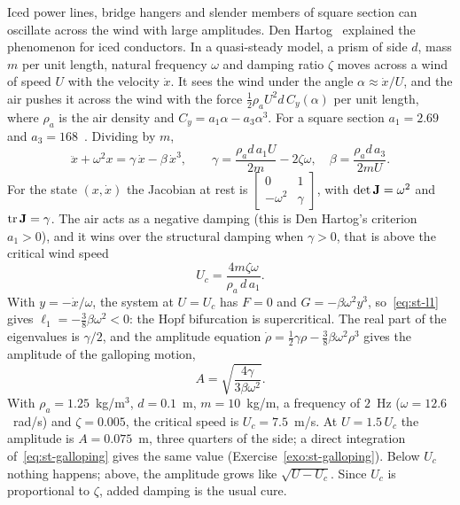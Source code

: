 \begin{example}\label{ex:st-galloping}
%
Iced power lines, bridge hangers and slender members of square section can oscillate
across the wind with large amplitudes. Den Hartog~\cite{st-denhartog1932} explained
the phenomenon for iced conductors. In a quasi-steady model, a prism of side $d$,
mass $m$ per unit length, natural frequency $\omega$ and damping ratio $\zeta$ moves
across a wind of speed $U$ with the velocity $\dot x$. It sees the wind under the
angle $\alpha \approx \dot x/U$, and the air pushes it across the wind with the force
$\tfrac12\rho_a U^2 d\,C_y(\alpha)$ per unit length, where $\rho_a$ is the air
density and $C_y = a_1\alpha - a_3\alpha^3$. For a square section
$a_1 = 2.69$ and $a_3 = 168$~\cite{st-parkinson1964}. Dividing by $m$,
\begin{equation}\label{eq:st-galloping}
  \ddot x + \omega^2 x = \gamma\,\dot x - \beta\,\dot x^3,
  \qquad
  \gamma = \frac{\rho_a d\,a_1 U}{2m} - 2\zeta\omega,
  \quad
  \beta = \frac{\rho_a d\,a_3}{2mU}.
\end{equation}
For the state $(x,\dot x)$ the Jacobian at rest is
$\begin{bmatrix} 0 & 1\\ -\omega^2 & \gamma\end{bmatrix}$, with $\det\mathbf{J} = \omega^2$
and $\operatorname{tr}\mathbf{J} = \gamma$. The air acts as a negative damping (this is Den Hartog's
criterion $a_1 > 0$), and it wins over the structural damping when $\gamma > 0$,
that is above the critical wind speed
\begin{equation}\label{eq:st-galloping-uc}
  U_c = \frac{4m\zeta\omega}{\rho_a\,d\,a_1}.
\end{equation}
With $y = -\dot x/\omega$, the system at $U = U_c$ has $F = 0$ and
$G = -\beta\omega^2 y^3$, so~\eqref{eq:st-l1} gives
$\ell_1 = -\tfrac38\beta\omega^2 < 0$: the Hopf bifurcation is supercritical. The
real part of the eigenvalues is $\gamma/2$, and the amplitude equation
$\dot\rho = \tfrac12\gamma\rho - \tfrac38\beta\omega^2\rho^3$ gives the amplitude
of the galloping motion,
\begin{equation}\label{eq:st-galloping-amp}
  A = \sqrt{\frac{4\gamma}{3\beta\omega^2}} .
\end{equation}
With $\rho_a = 1.25$~kg/m$^3$, $d = 0.1$~m, $m = 10$~kg/m, a frequency of
$2$~Hz ($\omega = 12.6$~rad/s) and $\zeta = 0.005$, the critical speed is
$U_c = 7.5$~m/s. At $U = 1.5\,U_c$ the amplitude is $A = 0.075$~m, three quarters
of the side; a direct integration of~\eqref{eq:st-galloping} gives the same value
(Exercise~\ref{exo:st-galloping}). Below $U_c$ nothing happens; above, the
amplitude grows like $\sqrt{U - U_c}$. Since $U_c$ is proportional to $\zeta$,
added damping is the usual cure.
\end{example}

